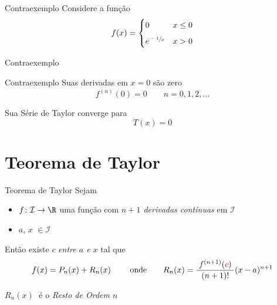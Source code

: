 \begin{frame}{Contraexemplo}
  Considere a função
  \[
    f(x) = \begin{cases}
      0                 & x \leq 0 \\[2mm]
      e^{\sfrac{-1}{x}} & x > 0
    \end{cases}
  \]
\end{frame}

\begin{frame}{Contraexemplo}
  \centering
  \scalebox{0.8}{}
\end{frame}

\begin{frame}{Contraexemplo}
  Suas derivadas em \(x=0\) são zero
  \[
    f^{(n)}(0) = 0 \qquad n = 0, 1, 2, \dots
  \]

  \pause
  \vspace{\baselineskip}
  Sua Série de Taylor converge para
  \[
    T(x) = 0
  \]
\end{frame}

\section{Teorema de Taylor}

\begin{frame}{Teorema de Taylor}
  Sejam
  \begin{itemize}
  \item \(f\colon\mathcal{I}\rightarrow \R\) uma função com \emph{$n+1$
        derivadas contínuas} em $\mathcal{I}$
  \item $a$, $x$ $\in\mathcal{I}$
  \end{itemize}

  \pause
  \vspace{\baselineskip}
  Então existe {\color{red}\(c\)} \emph{entre \(a\) e \(x\)} \pause tal que
  \[
    f(x)=P_n(x)+R_n(x)\
    \qquad \text{onde} \qquad
    R_n(x)=\frac{\;f^{(n+1)}({\color{red}c})\;}{(n+1)!}(x-a)^{n+1}
  \]

  \vspace{.5\baselineskip}
  $R_n(x)\;$ é o \emph{Resto de Ordem $n$}
\end{frame}

